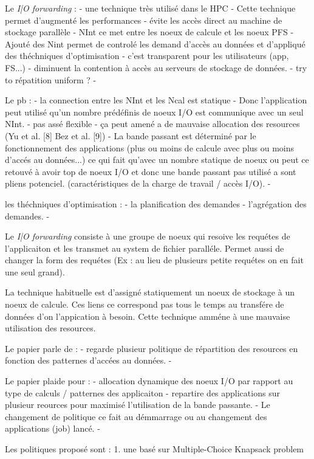 \documentclass[10pt, a4paper]{article}
\begin{document}

Le \emph{I|O forwarding} :
- une technique très utilisé dans le HPC
- Cette technique permet d'augmenté les performances
- évite les accès direct au machine de stockage parallèle
- NInt ce met entre les noeux de calcule et les noeux PFS
- Ajouté des Nint permet de controlé les demand d'accès au données et d'appliqué des théchniques d'optimisation
- c'est transparent pour les utilisateurs (app, FS...)
- diminuent la contention à accès au serveurs de stockage de données.
- try to répatition uniform ?
-

Le pb :
- la connection entre les NInt et les Ncal est statique
- Donc l'application peut utilisé qu'un nombre prédéfinis de noeux I/O est communique avec un seul NInt.
- pas assé flexible
- ça peut amené a de mauvaise allocation des resources (Yu et al. [8] Bez et al. [9])
- La bande passant est déterminé par le fonctionnement des applications (plus ou moins de calcule avec plus ou moins d'accés au données...) ce qui fait qu'avec un nombre statique de noeux ou peut ce retouvé à avoir top de noeux I/O et donc une bande passant pas utilisé a sont pliens potenciel. (caractéristiques de la charge de travail / accès I/O).
- 

les théchniques d'optimisation :
- la planification des demandes
- l'agrégation des demandes.
-

Le \emph{I|O forwarding} consiste à une groupe de noeux qui resoive les requétes de
l'applicaiton et les transmet au system de fichier paralléle. Permet aussi de changer la form
des requétes (Ex : au lieu de plusieurs petite requétes on en fait une seul grand).

La technique habituelle est d'assigné statiquement un noeux de stockage à un noeux de calcule.
Ces liens ce correspond pas tous le temps au transfére de données d'on l'appication à besoin.
Cette technique amméne à une mauvaise utilisation des resources.

Le papier parle de :
- regarde plusieur politique de répartition des resources en fonction des patternes d'accées au données.
- 

Le papier plaide pour :
- allocation dynamique des noeux I/O par rapport au type de calculs / patternes des applicaiton
- repartire des applications sur plusieur reources pour maximisé l'utilisation de la bande passante.
- Le changement de politique ce fait au démmarrage ou au changement des applications (job) lancé.
- 

Les politiques proposé sont :
1. une basé sur Multiple-Choice Knapsack problem
\end{document}
